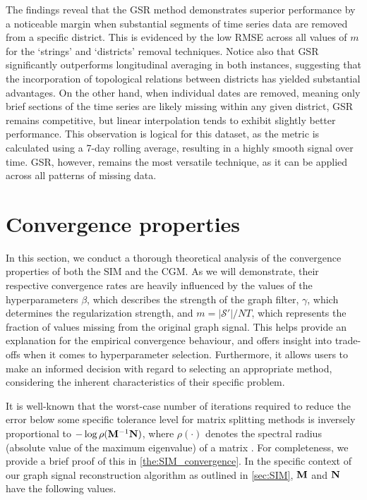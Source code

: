 The findings reveal that the GSR method demonstrates superior performance by a noticeable margin when substantial segments of time series data are removed from a specific district. This is evidenced by the low RMSE across all values of $m$ for the `strings' and `districts' removal techniques. Notice also that GSR significantly outperforms longitudinal averaging in both instances, suggesting that the incorporation of topological relations between districts has yielded substantial advantages. On the other hand, when individual dates are removed, meaning only brief sections of the time series are likely missing within any given district, GSR remains competitive, but linear interpolation tends to exhibit slightly better performance. This observation is logical for this dataset, as the metric is calculated using a 7-day rolling average, resulting in a highly smooth signal over time. GSR, however, remains the most versatile technique, as it can be applied across all patterns of missing data. 

 
\section{Convergence properties}

\label{sec:convergence}

In this section, we conduct a thorough theoretical analysis of the convergence properties of both the SIM and the CGM. As we will demonstrate, their respective convergence rates are heavily influenced by the values of the hyperparameters $\beta$, which describes the strength of the graph filter, $\gamma$, which determines the regularization strength, and $m=|\mathcal{S}'|/NT$, which represents the fraction of values missing from the original graph signal. This helps provide an explanation for the empirical convergence behaviour, and offers insight into trade-offs when it comes to hyperparameter selection. Furthermore, it allows users to make an informed decision with regard to selecting an appropriate method, considering the inherent characteristics of their specific problem. 

It is well-known that the worst-case number of iterations required to reduce the error below some specific tolerance level for matrix splitting methods is inversely proportional to $-\log \rho(\mathbf{M}^{-1}\mathbf{N})$, where $\rho(\cdot)$ denotes the spectral radius (absolute value of the maximum eigenvalue) of a matrix \citep{Demmel1997}. For completeness, we provide a brief proof of this in \cref{the:SIM_convergence}. In the specific context of our graph signal reconstruction algorithm as outlined in \cref{sec:SIM}, $\mathbf{M}$ and $\mathbf{N}$ have the following values.  


